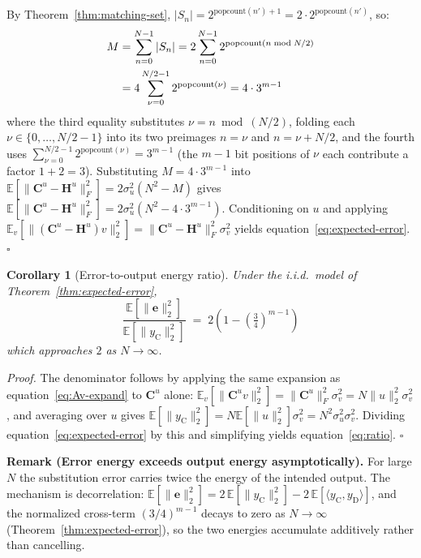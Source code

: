 \documentclass[10pt,a4paper]{amsart}
\newtheorem{corollary}[theorem]{Corollary}
\begin{document}
By Theorem~\ref{thm:matching-set}, $|S_n| = 2^{\mathrm{popcount}(n')+1} = 2\cdot 2^{\mathrm{popcount}(n')}$, so:
\begin{align}
    M &= \sum_{n=0}^{N-1}|S_n|
      = 2\sum_{n=0}^{N-1}2^{\mathrm{popcount}(n\bmod N/2)} \notag\\
      &= 4\sum_{\nu=0}^{N/2-1}2^{\mathrm{popcount}(\nu)}
      = 4\cdot 3^{m-1}
\end{align}
where the third equality substitutes $\nu = n\bmod(N/2)$, folding each $\nu \in \{0,\ldots,N/2-1\}$ into its two preimages $n=\nu$ and $n=\nu+N/2$, and the fourth uses $\sum_{\nu=0}^{N/2-1}2^{\mathrm{popcount}(\nu)} = 3^{m-1}$ (the $m-1$ bit positions of $\nu$ each contribute a factor $1+2=3$). Substituting $M = 4\cdot 3^{m-1}$ into $\mathbb{E}[\|\mathbf{C}^u-\mathbf{H}^u\|_F^2] = 2\sigma_u^2(N^2-M)$ gives $\mathbb{E}[\|\mathbf{C}^u-\mathbf{H}^u\|_F^2] = 2\sigma_u^2(N^2 - 4\cdot 3^{m-1})$. Conditioning on $u$ and applying $\mathbb{E}_v[\|(\mathbf{C}^u-\mathbf{H}^u)v\|_2^2] = \|\mathbf{C}^u-\mathbf{H}^u\|_F^2\sigma_v^2$ yields equation~\eqref{eq:expected-error}. $\square$

\medskip
\begin{corollary}[Error-to-output energy ratio]\label{cor:ratio}
Under the i.i.d.\ model of Theorem~\ref{thm:expected-error},
\begin{equation}
    \label{eq:ratio}
    \frac{\mathbb{E}[\|\mathbf{e}\|_2^2]}{\mathbb{E}[\|y_{\mathrm{C}}\|_2^2]} \;=\; 2\!\left(1-\!\left(\tfrac{3}{4}\right)^{\!m-1}\right)
\end{equation}
which approaches $2$ as $N\to\infty$.
\end{corollary}

\noindent\textit{Proof.} The denominator follows by applying the same expansion as equation~\eqref{eq:Av-expand} to $\mathbf{C}^u$ alone: $\mathbb{E}_v[\|\mathbf{C}^u v\|_2^2] = \|\mathbf{C}^u\|_F^2\sigma_v^2 = N\|u\|_2^2\sigma_v^2$, and averaging over $u$ gives $\mathbb{E}[\|y_{\mathrm{C}}\|_2^2] = N\mathbb{E}[\|u\|_2^2]\sigma_v^2 = N^2\sigma_u^2\sigma_v^2$. Dividing equation~\eqref{eq:expected-error} by this and simplifying yields equation~\eqref{eq:ratio}. $\square$

\medskip
\noindent\textbf{Remark (Error energy exceeds output energy asymptotically).} For large $N$ the substitution error carries twice the energy of the intended output. The mechanism is decorrelation: $\mathbb{E}[\|\mathbf{e}\|_2^2] = 2\,\mathbb{E}[\|y_{\mathrm{C}}\|_2^2] - 2\,\mathbb{E}[\langle y_{\mathrm{C}}, y_{\mathrm{D}}\rangle]$, and the normalized cross-term $(3/4)^{m-1}$ decays to zero as $N\to\infty$ (Theorem~\ref{thm:expected-error}), so the two energies accumulate additively rather than cancelling.
\end{document}
